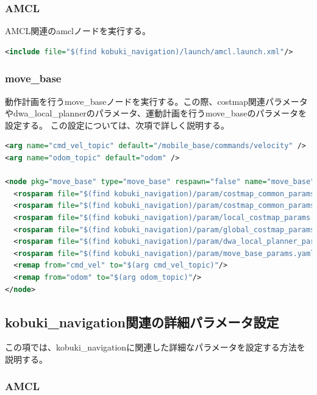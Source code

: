 \subsubsection{AMCL}

AMCL関連のamclノードを実行する。

\begin{lstlisting}[language=XML]
<include file="$(find kobuki_navigation)/launch/amcl.launch.xml"/>
\end{lstlisting}

\subsubsection{move\_base}

動作計画を行うmove\_baseノードを実行する。この際、costmap関連パラメータやdwa\_local\_plannerのパラメータ、運動計画を行うmove\_baseのパラメータを設定する。  この設定については、次項で詳しく説明する。

\begin{lstlisting}[language=XML]
<arg name="cmd_vel_topic" default="/mobile_base/commands/velocity" />
<arg name="odom_topic" default="odom" />

<node pkg="move_base" type="move_base" respawn="false" name="move_base" output="screen">
  <rosparam file="$(find kobuki_navigation)/param/costmap_common_params.yaml" command="load" ns="global_costmap" />
  <rosparam file="$(find kobuki_navigation)/param/costmap_common_params.yaml" command="load" ns="local_costmap" />
  <rosparam file="$(find kobuki_navigation)/param/local_costmap_params.yaml" command="load" />
  <rosparam file="$(find kobuki_navigation)/param/global_costmap_params.yaml" command="load" />
  <rosparam file="$(find kobuki_navigation)/param/dwa_local_planner_params.yaml" command="load" />
  <rosparam file="$(find kobuki_navigation)/param/move_base_params.yaml" command="load" />
  <remap from="cmd_vel" to="$(arg cmd_vel_topic)"/>
  <remap from="odom" to="$(arg odom_topic)"/>
</node>
\end{lstlisting}

\subsection{kobuki\_navigation関連の詳細パラメータ設定}

この項では、kobuki\_navigationに関連した詳細なパラメータを設定する方法を説明する。

\subsubsection{AMCL}

